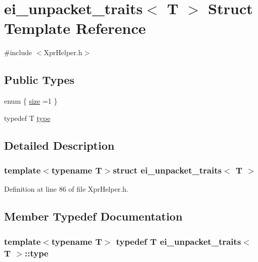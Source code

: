 \hypertarget{structei__unpacket__traits}{\section{ei\-\_\-unpacket\-\_\-traits$<$ T $>$ Struct Template Reference}
\label{structei__unpacket__traits}
}


{\ttfamily \#include $<$Xpr\-Helper.\-h$>$}

\subsection*{Public Types}
\begin{DoxyCompactItemize}
\item 
enum \{ \hyperlink{structei__unpacket__traits_af9a699b139da700d28fccc35788b2a52a2f50f1bedf68a8ff094dd3bb898bb2f7}{size} =1
 \}
\item 
typedef T \hyperlink{structei__unpacket__traits_a9a4103abb2832a9d2951d414496213a0}{type}
\end{DoxyCompactItemize}


\subsection{Detailed Description}
\subsubsection*{template$<$typename T$>$struct ei\-\_\-unpacket\-\_\-traits$<$ T $>$}



Definition at line 86 of file Xpr\-Helper.\-h.



\subsection{Member Typedef Documentation}
\hypertarget{structei__unpacket__traits_a9a4103abb2832a9d2951d414496213a0}{
\subsubsection[{type}]{\setlength{\rightskip}{0pt plus 5cm}template$<$typename T$>$ typedef T {\bf ei\-\_\-unpacket\-\_\-traits}$<$ T $>$\-::{\bf type}}}\label{structei__unpacket__traits_a9a4103abb2832a9d2951d414496213a0}


